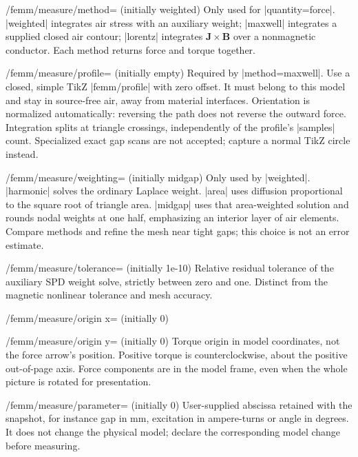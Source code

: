 \begin{key}{/femm/measure/method= (initially weighted)}
Only used for |quantity=force|. |weighted| integrates air stress with an
auxiliary weight; |maxwell| integrates a supplied closed air contour;
|lorentz| integrates $\mathbf J\times\mathbf B$ over a nonmagnetic conductor.
Each method returns force and torque together.
\end{key}
\begin{key}{/femm/measure/profile= (initially empty)}
Required by |method=maxwell|. Use a closed, simple TikZ |femm/profile| with
zero offset. It must belong to this model and stay in source-free air, away
from material interfaces. Orientation is normalized automatically: reversing
the path does not reverse the outward force. Integration splits at triangle
crossings, independently of the profile's |samples| count. Specialized exact
gap scans are not accepted; capture a normal TikZ circle instead.
\end{key}
\begin{key}{/femm/measure/weighting= (initially midgap)}
Only used by |weighted|. |harmonic| solves the ordinary Laplace weight.
|area| uses diffusion proportional to the square root of triangle area.
|midgap| uses that area-weighted solution and rounds nodal weights at one half,
emphasizing an interior layer of air elements. Compare methods and refine the
mesh near tight gaps; this choice is not an error estimate.
\end{key}
\begin{key}{/femm/measure/tolerance= (initially 1e-10)}
Relative residual tolerance of the auxiliary SPD weight solve, strictly between
zero and one. Distinct from the magnetic nonlinear tolerance and mesh accuracy.
\end{key}
\begin{key}{/femm/measure/origin x= (initially 0)}
\end{key}
\begin{key}{/femm/measure/origin y= (initially 0)}
Torque origin in model coordinates, not the force arrow's position. Positive
torque is counterclockwise, about the positive out-of-page axis. Force components
are in the model frame, even when the whole picture is rotated for presentation.
\end{key}
\begin{key}{/femm/measure/parameter= (initially 0)}
User-supplied abscissa retained with the snapshot, for instance gap in mm,
excitation in ampere-turns or angle in degrees. It does not change the physical
model; declare the corresponding model change before measuring.
\end{key}

